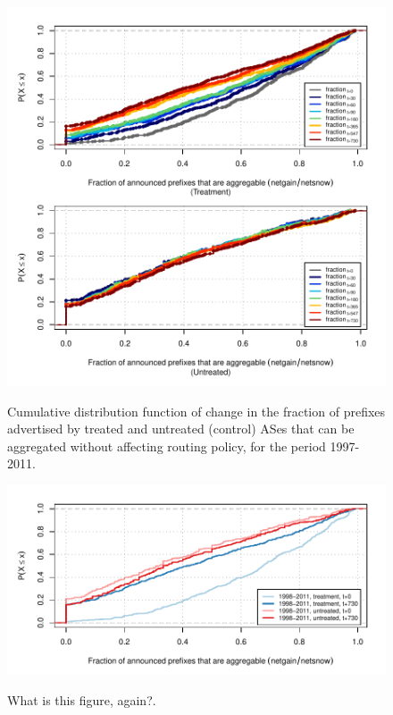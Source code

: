 \begin{figure}[H]
\begin{centering}
\begin{singlespace}
    \includegraphics[width=6in]{figures/behavior-frac_deagg-1997_2011-corr.pdf}
    \vspace{-2em}\\
    \caption{Cumulative distribution function of change in the fraction of
    prefixes advertised by treated and untreated (control) ASes that can be
    aggregated without affecting routing policy, for the period 1997-2011.}
\end{singlespace}
\end{centering}
\end{figure}

\begin{figure}[H]
\begin{centering}
\begin{singlespace}
    \includegraphics[width=6in]
        {figures/behavior-frac_deagg-1997_2011-special_tc.pdf}
    \vspace{-2em}\\
    \caption{What is this figure, again?.}
\end{singlespace}
\end{centering}
\end{figure}






